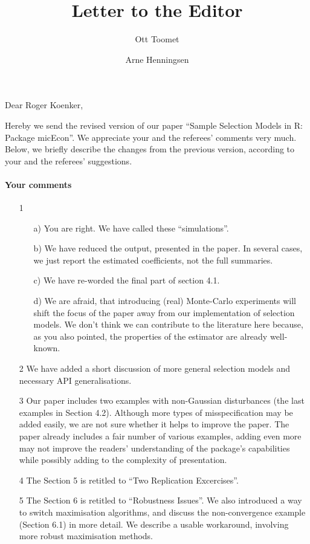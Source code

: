 \documentclass[a4paper]{article}
\title{Letter to the Editor}
\author{Ott Toomet \and Arne Henningsen}
\begin{document}
\maketitle

Dear Roger Koenker,

\bigskip

Hereby we send the revised version of our paper ``Sample Selection
Models in R: Package micEcon''.  We appreciate your and the referees'
comments very much.  Below, we briefly describe the changes from
the previous version, according to your and the referees' suggestions.

\paragraph{Your comments}

\begin{itemize}
\item[1]
  \begin{itemize}
  \item[a)] You are right.  We have called these ``simulations''.
  \item[b)] We have reduced the output, presented in the paper.  In
    several cases, we just report the estimated coefficients, not the
    full summaries.
  \item[c)] We have re-worded the final part of section 4.1.
  \item[d)] We are afraid, that introducing (real) Monte-Carlo
    experiments will shift the focus of the paper away from our
    implementation of selection models.  We don't think we can
    contribute to the literature here because, as you also pointed,
    the properties of the estimator are already well-known.    
  \end{itemize}
\item[2] We have added a short discussion of more general selection
  models and necessary API generalisations.
\item[3] Our paper includes two examples with non-Gaussian
  disturbances (the last examples in Section 4.2).  Although more
  types of misspecification may be added easily, we are not sure
  whether it helps to improve the paper.  The paper already includes a
  fair number of various examples, adding even more may not improve
  the readers' understanding of the package's capabilities while
  possibly adding to the complexity of presentation.
\item[4] The Section 5 is retitled to ``Two Replication Excercises''.
\item[5] The Section 6 is retitled to ``Robustness Issues''.  We also
  introduced a way to switch maximisation algorithms, and discuss the
  non-convergence example (Section 6.1) in more detail.  We describe a
  usable workaround, involving more robust maximisation methods.
\end{itemize}
\end{document}
